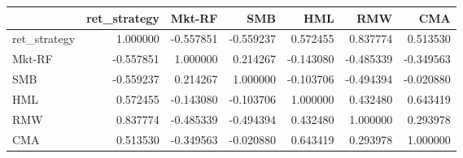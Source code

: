 \begin{tabular}{lrrrrrr}
\toprule
{} &  ret\_strategy &    Mkt-RF &       SMB &       HML &       RMW &       CMA \\
\midrule
ret\_strategy &      1.000000 & -0.557851 & -0.559237 &  0.572455 &  0.837774 &  0.513530 \\
Mkt-RF       &     -0.557851 &  1.000000 &  0.214267 & -0.143080 & -0.485339 & -0.349563 \\
SMB          &     -0.559237 &  0.214267 &  1.000000 & -0.103706 & -0.494394 & -0.020880 \\
HML          &      0.572455 & -0.143080 & -0.103706 &  1.000000 &  0.432480 &  0.643419 \\
RMW          &      0.837774 & -0.485339 & -0.494394 &  0.432480 &  1.000000 &  0.293978 \\
CMA          &      0.513530 & -0.349563 & -0.020880 &  0.643419 &  0.293978 &  1.000000 \\
\bottomrule
\end{tabular}
